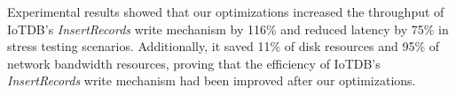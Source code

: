 \begin{abstract*}
  Experimental results showed that our optimizations increased the throughput of IoTDB's \emph{InsertRecords} write mechanism by 116\% and reduced latency by 75\% in stress testing scenarios. Additionally, it saved 11\% of disk resources and 95\% of network bandwidth resources, proving that the efficiency of IoTDB's \emph{InsertRecords} write mechanism had been improved after our optimizations.
\end{abstract*}
